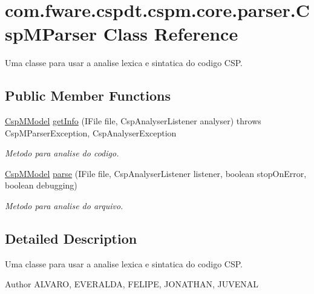 \hypertarget{classcom_1_1fware_1_1cspdt_1_1cspm_1_1core_1_1parser_1_1_csp_m_parser}{}\section{com.\+fware.\+cspdt.\+cspm.\+core.\+parser.\+Csp\+M\+Parser Class Reference}
\label{classcom_1_1fware_1_1cspdt_1_1cspm_1_1core_1_1parser_1_1_csp_m_parser}


Uma classe para usar a analise lexica e sintatica do codigo C\+SP.  


\subsection*{Public Member Functions}
\begin{DoxyCompactItemize}
\item 
\hyperlink{classcom_1_1fware_1_1cspdt_1_1cspm_1_1core_1_1model_1_1_csp_m_model}{Csp\+M\+Model} \hyperlink{classcom_1_1fware_1_1cspdt_1_1cspm_1_1core_1_1parser_1_1_csp_m_parser_abcd9ef2aecf9c7a1de12da310357e831}{get\+Info} (I\+File file, Csp\+Analyser\+Listener analyser)  throws Csp\+M\+Parser\+Exception, Csp\+Analyser\+Exception 
\begin{DoxyCompactList}\small\item\em Metodo para analise do codigo. \end{DoxyCompactList}\item 
\hyperlink{classcom_1_1fware_1_1cspdt_1_1cspm_1_1core_1_1model_1_1_csp_m_model}{Csp\+M\+Model} \hyperlink{classcom_1_1fware_1_1cspdt_1_1cspm_1_1core_1_1parser_1_1_csp_m_parser_a4fb399c8ac1c19c8b089f3021cf56986}{parse} (I\+File file, Csp\+Analyser\+Listener listener, boolean stop\+On\+Error, boolean debugging)
\begin{DoxyCompactList}\small\item\em Metodo para analise do arquivo. \end{DoxyCompactList}\end{DoxyCompactItemize}


\subsection{Detailed Description}
Uma classe para usar a analise lexica e sintatica do codigo C\+SP. 

\begin{DoxyAuthor}{Author}
A\+L\+V\+A\+RO, E\+V\+E\+R\+A\+L\+DA, F\+E\+L\+I\+PE, J\+O\+N\+A\+T\+H\+AN, J\+U\+V\+E\+N\+AL 
\end{DoxyAuthor}


